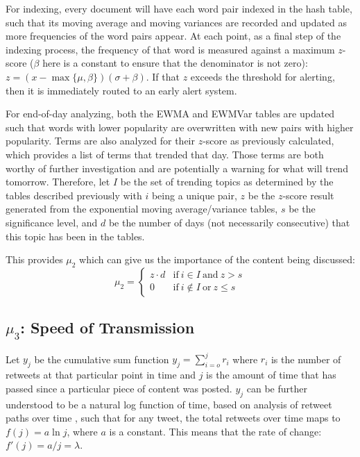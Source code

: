 \documentclass[preprint,12pt]{elsarticle}
\begin{document}
For indexing, every document will have each word pair indexed in the hash table, such that its moving average and moving variances are recorded and updated as more frequencies of the word pairs appear. At each point, as a final step of the indexing process, the frequency of that word is measured against a maximum $z$-score ($\beta$ here is a constant to ensure that the denominator is not zero): $z = (x-\max\{\mu, \beta\})(\sigma + \beta)$. If that $z$ exceeds the threshold for alerting, then it is immediately routed to an early alert system.

For end-of-day analyzing, both the EWMA and EWMVar tables are updated such that words with lower popularity are overwritten with new pairs with higher popularity. Terms are also analyzed for their $z$-score as previously calculated, which provides a list of terms that trended that day. Those terms are both worthy of further investigation and are potentially a warning for what will trend tomorrow. Therefore, let $I$ be the set of trending topics as determined by the tables described previously with $i$ being a unique pair, $z$ be the $z$-score result generated from the exponential moving average/variance tables, $s$ be the significance level, and $d$ be the number of days (not necessarily consecutive) that this topic has been in the tables.

This provides $\mu_2$ which can give us the importance of the content being discussed:
\begin{equation}
\label{mu_2 equation}
    \mu_2 = \begin{cases}
    z\cdot d  & \text{if}\ i \in I\ \text{and}\  z > s \\
    0\  & \text{if}\ i \notin I \ \text{or} \ z \leq s
    \end{cases}
\end{equation}

\subsection{$\mu_3$: Speed of Transmission}
Let $y_j$ be the cumulative sum function $y_j = \sum_{i=o}^j r_i$ where $r_i$ is the number of retweets at that particular point in time and $j$ is the amount of time that has passed since a particular piece of content was posted. $y_j$ can be further understood to be a natural log function of time, based on analysis of retweet paths over time \cite{gabielkov2016social,starbird2014rumors,mention2018twitter}, such that for any tweet, the total retweets over time maps to $f(j) = a \ln j$, where $a$ is a constant. This means that the rate of change: $f'(j) = a /j = \lambda$.
\end{document}

